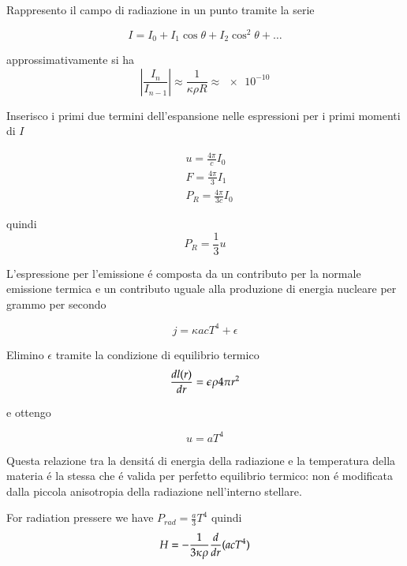 \documentclass[main.tex]{subfiles}
\newcommand{\mblock}[1]{ {\allowbreak $#1$ }}
\begin{document}
Rappresento il campo di radiazione in un punto tramite la serie

\begin{equation*}
I=I_0+I_1\cos{\theta}+I_2\cos^2{\theta}+\ldots
\end{equation*}

approssimativamente si ha
\begin{equation*}
|\frac{I_n}{I_{n-1}}|\approx\frac{1}{\kappa\rho R}\approx\num{e-10}
\end{equation*}

Inserisco i primi due termini dell'espansione nelle espressioni per i primi momenti di $I$

\begin{align*}
&u=\frac{4\pi}{c}I_0\\
&F=\frac{4\pi}{3}I_1\\
&P_R=\frac{4\pi}{3c}I_0
\end{align*}

quindi
\begin{equation*}
P_R=\frac{1}{3}u
\end{equation*}

L'espressione per l'emissione \'e composta da un contributo per la normale emissione termica e un contributo uguale alla produzione di energia nucleare per grammo per secondo

\begin{equation*}
j=\kappa acT^4+\epsilon
\end{equation*}

Elimino $\epsilon$ tramite la condizione di equilibrio termico
\begin{equation*}
    \TDy{r}{l(r)}=\epsilon\rho4\pi r^2
\end{equation*}

e ottengo

\begin{equation*}
u=aT^4
\end{equation*}


Questa relazione tra la densit\'a di energia della radiazione e la temperatura della materia \'e la stessa che \'e valida per perfetto equilibrio termico: non \'e modificata dalla piccola anisotropia della radiazione nell'interno stellare.

For radiation pressere we have \mblock{P_{rad}=\frac{a}{3}T^4} quindi
\begin{equation*}
H=-\frac{1}{3\kappa\rho}\TDof{r}(acT^4)
\end{equation*}

\clearpage
\end{document}
